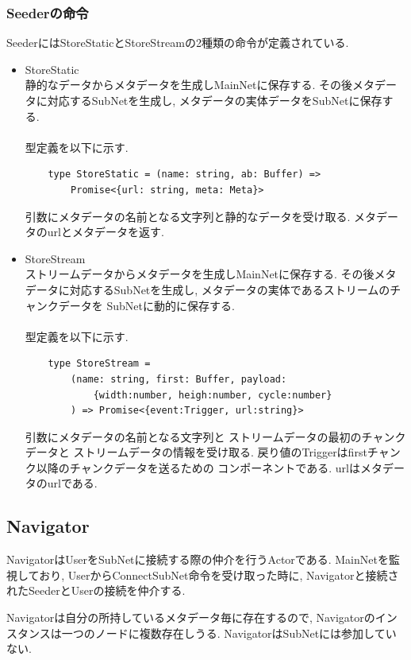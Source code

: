 \documentclass[sotsuron]{jcsie}
\begin{document}
\subsubsection{Seederの命令}
SeederにはStoreStaticとStoreStreamの2種類の命令が定義されている.
\begin{itemize}
	\item{StoreStatic} \\
	静的なデータからメタデータを生成しMainNetに保存する.
	その後メタデータに対応するSubNetを生成し, 
	メタデータの実体データをSubNetに保存する.\\\\					
	型定義を以下に示す.
	\begin{lstlisting}
	type StoreStatic = (name: string, ab: Buffer) =>
		Promise<{url: string, meta: Meta}>
	\end{lstlisting}
					
	引数にメタデータの名前となる文字列と静的なデータを受け取る.
	メタデータのurlとメタデータを返す.
	\\
	\item {StoreStream}\\
	      ストリームデータからメタデータを生成しMainNetに保存する.
	      その後メタデータに対応するSubNetを生成し, 
		  メタデータの実体であるストリームのチャンクデータを
		  SubNetに動的に保存する.\\\\		  
	      型定義を以下に示す.
	      \begin{lstlisting}
	type StoreStream = 
		(name: string, first: Buffer, payload:
			{width:number, heigh:number, cycle:number}
		) => Promise<{event:Trigger, url:string}>
	      \end{lstlisting}

	      引数にメタデータの名前となる文字列と
	      ストリームデータの最初のチャンクデータと
	      ストリームデータの情報を受け取る.
	      戻り値のTriggerはfirstチャンク以降のチャンクデータを送るための
	      コンポーネントである. urlはメタデータのurlである.
\end{itemize}

\subsection{Navigator}
NavigatorはUserをSubNetに接続する際の仲介を行うActorである.
MainNetを監視しており, UserからConnectSubNet命令を受け取った時に, 
Navigatorと接続されたSeederとUserの接続を仲介する.

Navigatorは自分の所持しているメタデータ毎に存在するので, 
Navigatorのインスタンスは一つのノードに複数存在しうる.
NavigatorはSubNetには参加していない.
\end{document}
